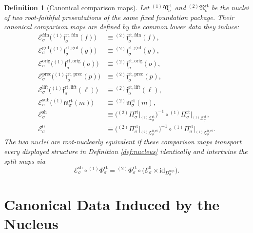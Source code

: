 \documentclass[11pt]{article}
\newcommand{\RootProj}[1]{\Pi_{#1}^{\mathrm{rt}}}
\newcommand{\RootFoundMin}[1]{\mathfrak f_{#1}^{\mathrm{rt,fdn}}}
\newcommand{\RootGroundMin}[1]{\mathfrak f_{#1}^{\mathrm{rt,grd}}}
\newcommand{\RootOrigMin}[1]{\mathfrak f_{#1}^{\mathrm{rt,orig}}}
\newcommand{\RootPrecMin}[1]{\mathfrak f_{#1}^{\mathrm{rt,prec}}}
\newcommand{\RootLiftMin}[1]{\mathfrak f_{#1}^{\mathrm{rt,lift}}}
\newcommand{\RootSubMin}[1]{\mathfrak m_{#1}^{\mathrm{rt}}}
\newcommand{\RootShellSet}[1]{\mathcal Z_{#1}^{\mathrm{rt}}}
\newcommand{\RootZeroCore}[1]{\mathcal Z_{#1}^{0,\mathrm{rt}}}
\newcommand{\RootSplit}[1]{\Phi_{#1}^{\mathrm{rt}}}
\newcommand{\SeedHiddenBody}[1]{D_{#1}^{\mathrm{sup}}}
\newcommand{\RootNucleus}[1]{\mathfrak N_{#1}^{\mathrm{rt}}}
\newcommand{\RootMapFound}[1]{\mathcal E_{#1}^{\mathrm{fdn}}}
\newcommand{\RootMapGround}[1]{\mathcal E_{#1}^{\mathrm{grd}}}
\newcommand{\RootMapOrig}[1]{\mathcal E_{#1}^{\mathrm{orig}}}
\newcommand{\RootMapPrec}[1]{\mathcal E_{#1}^{\mathrm{prec}}}
\newcommand{\RootMapLift}[1]{\mathcal E_{#1}^{\mathrm{lift}}}
\newcommand{\RootMapSub}[1]{\mathcal E_{#1}^{\mathrm{sub}}}
\newcommand{\RootMapShell}[1]{\mathcal E_{#1}^{\mathrm{sh}}}
\newcommand{\RootMapZero}[1]{\mathcal E_{#1}^{0}}
\newtheorem{definition}{Definition}
\begin{document}
\begin{definition}[Canonical comparison maps]
\label{def:equiv}
Let \({}^{(1)}\!\RootNucleus{\sigma}\) and \({}^{(2)}\!\RootNucleus{\sigma}\) be the nuclei of two root-faithful presentations of the same fixed foundation package. Their canonical comparison maps are defined by the common lower data they induce:
\begin{align}
\RootMapFound{\sigma}\bigl({}^{(1)}\!\RootFoundMin{\sigma}(f)\bigr)
&\equiv
{}^{(2)}\!\RootFoundMin{\sigma}(f),
\\
\RootMapGround{\sigma}\bigl({}^{(1)}\!\RootGroundMin{\sigma}(g)\bigr)
&\equiv
{}^{(2)}\!\RootGroundMin{\sigma}(g),
\\
\RootMapOrig{\sigma}\bigl({}^{(1)}\!\RootOrigMin{\sigma}(o)\bigr)
&\equiv
{}^{(2)}\!\RootOrigMin{\sigma}(o),
\\
\RootMapPrec{\sigma}\bigl({}^{(1)}\!\RootPrecMin{\sigma}(p)\bigr)
&\equiv
{}^{(2)}\!\RootPrecMin{\sigma}(p),
\\
\RootMapLift{\sigma}\bigl({}^{(1)}\!\RootLiftMin{\sigma}(\ell)\bigr)
&\equiv
{}^{(2)}\!\RootLiftMin{\sigma}(\ell),
\\
\RootMapSub{\sigma}\bigl({}^{(1)}\!\RootSubMin{\sigma}(m)\bigr)
&\equiv
{}^{(2)}\!\RootSubMin{\sigma}(m),
\\
\RootMapShell{\sigma}
&\equiv
\bigl({}^{(2)}\!\RootProj{\sigma}\big|_{{}^{(2)}\!\RootShellSet{\sigma}}\bigr)^{-1}
\circ
{}^{(1)}\!\RootProj{\sigma}\big|_{{}^{(1)}\!\RootShellSet{\sigma}},
\\
\RootMapZero{\sigma}
&\equiv
\bigl({}^{(2)}\!\RootProj{\sigma}\big|_{{}^{(2)}\!\RootZeroCore{\sigma}}\bigr)^{-1}
\circ
{}^{(1)}\!\RootProj{\sigma}\big|_{{}^{(1)}\!\RootZeroCore{\sigma}}.
\end{align}
The two nuclei are \emph{root-nuclearly equivalent} if these comparison maps transport every displayed structure in Definition \ref{def:nucleus} identically and intertwine the split maps via
\[
\RootMapShell{\sigma}\circ{}^{(1)}\!\RootSplit{\sigma}
=
{}^{(2)}\!\RootSplit{\sigma}\circ
\bigl(\RootMapZero{\sigma}\times\mathrm{id}_{\SeedHiddenBody{\sigma}}\bigr).
\]
\end{definition}

\section{Canonical Data Induced by the Nucleus}
\end{document}
